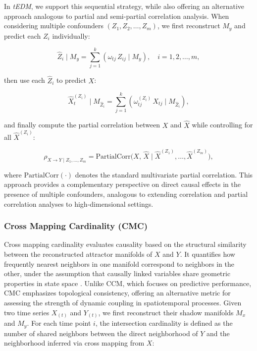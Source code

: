 \documentclass[authoryear,preprint,review,12pt]{elsarticle}
\begin{document}
In \textit{tEDM}, we support this sequential strategy, while also offering an alternative approach analogous to partial and semi-partial correlation analysis. When considering multiple confounders $(Z_1, Z_2, \dots, Z_m)$, we first reconstruct $M_y$ and predict each $Z_i$ individually:

\begin{equation}\label{eq_pcm_multi_zhat}
\hat{Z}_i \mid M_y = \sum_{j=1}^k \left( \omega_{tj} \, Z_{ij} \mid M_y \right), \quad i=1,2,\dots,m,
\end{equation}

\noindent then use each $\hat{Z}_i$ to predict $X$:

\begin{equation}\label{eq_pcm_multi_xhat}
\hat{X}^{(Z_i)}_t \mid M_{\hat{Z}_i} = \sum_{j=1}^k \left( \omega^{(Z_i)}_{tj} \, X_{tj} \mid M_{\hat{Z}_i} \right),
\end{equation}

\noindent and finally compute the partial correlation between $X$ and $\hat{X}$ while controlling for all $\hat{X}^{(Z_i)}$:

\begin{equation}\label{eq_pcm_multi_partial_corr}
\rho_{X \to Y \mid Z_1, \dots, Z_m} = \text{PartialCorr}\Big(X,\, \hat{X} \mid \hat{X}^{(Z_1)}, \dots, \hat{X}^{(Z_m)} \Big),
\end{equation}

\noindent where $\text{PartialCorr}(\cdot)$ denotes the standard multivariate partial correlation. This approach provides a complementary perspective on direct causal effects in the presence of multiple confounders, analogous to extending correlation and partial correlation analyses to high-dimensional settings.

\subsubsection{Cross Mapping Cardinality (CMC)}

Cross mapping cardinality evaluates causality based on the structural similarity between the reconstructed attractor manifolds of $X$ and $Y$. It quantifies how frequently nearest neighbors in one manifold correspond to neighbors in the other, under the assumption that causally linked variables share geometric properties in state space \citep{tao2023cmc}. Unlike CCM, which focuses on predictive performance, CMC emphasizes topological consistency, offering an alternative metric for assessing the strength of dynamic coupling in spatiotemporal processes. Given two time series $X_{(t)}$ and $Y_{(t)}$, we first reconstruct their shadow manifolds $M_x$ and $M_y$. For each time point $i$, the intersection cardinality is defined as the number of shared neighbors between the direct neighborhood of $Y$ and the neighborhood inferred via cross mapping from $X$:
\end{document}
